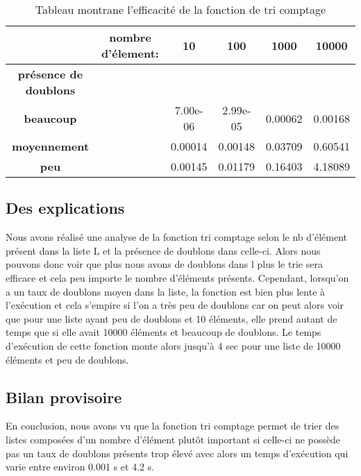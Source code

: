 \documentclass[a4paper, 12pt]{article}
\begin{document}
\begin{table}[htbp]
  \centering
  \begin{tabular}{||c c|c|c|c|c||}\hline
    \textbf{} & \textbf{nombre d'élement:} & \textbf{10} & \textbf{100} & \textbf{1000} & \textbf{10000}\\\hline\hline
    \textbf{présence de doublons} & 	& 	& 	& 	&\\\hline
    \textbf{beaucoup}           &	   & 7.00e-06    & 2.99e-05	& 0.00062	& 0.00168    \\\hline
    \textbf{moyennement}        &  	   & 0.00014     & 0.00148      & 0.03709	& 0.60541    \\\hline
    \textbf{peu}         	&          & 0.00145     & 0.01179      & 0.16403	& 4.18089    \\\hline
  \end{tabular}
  \caption{Tableau montrane l'efficacité de la fonction de tri comptage}
  \label{montableau1}
\end{table}

\subsection{Des explications}

Nous avons réalisé une analyse de la fonction tri comptage selon le nb d’élément présent dans la liste L et la présence de doublons dans celle-ci. Alors nous pouvons donc voir que plus nous avons de doublons dans l plus le trie sera efficace et cela peu importe le nombre d’éléments présents. Cependant, lorsqu’on a un taux de doublons moyen dans la liste, la fonction est bien plus lente à l’exécution et cela s’empire si l’on a très peu de doublons car on peut alors voir que pour une liste ayant peu de doublons et 10 éléments, elle prend autant de temps que si elle avait 10000 éléments et beaucoup de doublons. Le temps d’exécution de cette fonction monte alors jusqu’à 4 sec pour une liste de 10000 éléments et peu de doublons. 

\subsection{Bilan provisoire}

En conclusion, nous avons vu que la fonction tri comptage permet de trier des listes composées d’un nombre d’élément plutôt important si celle-ci ne possède pas un taux de doublons présents trop élevé avec alors un temps d’exécution qui varie entre environ 0.001 s et 4.2 s.
\end{document}
